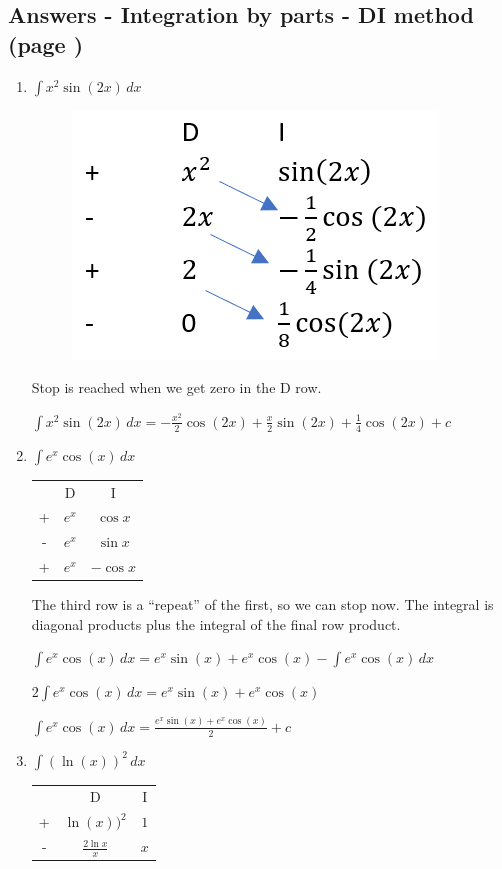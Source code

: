 \documentclass[../main.tex]{subfiles}
\begin{document}
\subsection*{Answers - Integration by parts - DI method (page \pageref{DI Method})}

\begin{enumerate}
    \item \(\int x^2\sin{(2x)}\, dx\)
    
    \begin{figure}[h]
    \setlength\parindent{30pt}
        \includegraphics[width=0.25\linewidth]{images/di_a1.png}
    \end{figure}
    
    Stop is reached when we get zero in the D row.

    \(\int x^2\sin{(2x)}\, dx=-\frac{x^2}{2}\cos{(2x)}+\frac{x}{2}\sin{(2x)}+\frac{1}{4}\cos{(2x)}+c\)

    \item \(\int e^x \cos{(x)}\, dx\)
    
    \begin{tabular}{ c c c }
       & D & I \\ 
     +  & $e^x$ &$\cos{x}$ \\  
     - & $e^x$ & $\sin{x}$\\
      + & $e^x$ & $-\cos{x}$ \\  
    \end{tabular}

    The third row is a “repeat” of the first, so we can stop now. The integral is diagonal products plus the integral of the final row product.

    \(\int e^x \cos{(x)}\, dx = e^x\sin{(x)}+e^x\cos{(x)}-\int e^x\cos{(x)}\,dx\)

    \(2\int e^x \cos{(x)}\, dx= e^x\sin{(x)}+e^x\cos{(x)}\)

    \(\int e^x \cos{(x)}\, dx=\frac{e^x\sin{(x)}+e^x\cos{(x)}}{2}+c\)
    
    \item \(\int (\ln{(x)})^2\, dx\)
    
    \begin{tabular}{ c c c }
       & D & I \\ 
     +  & $\ln{(x)})^2$ &$1$ \\  
     - & $\frac{2\ln{x}}{x}$ & $x$\\ 
    \end{tabular}


\end{enumerate}
\end{document}
